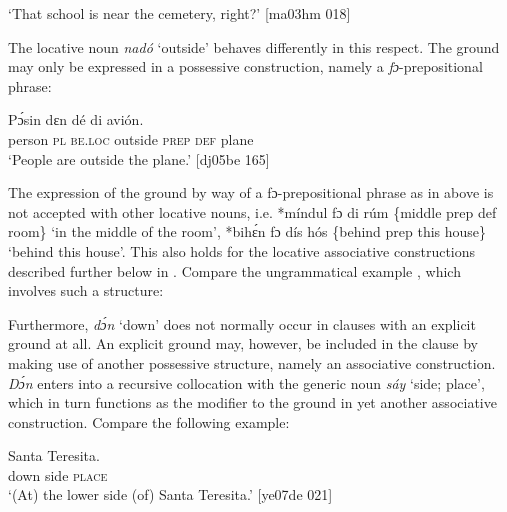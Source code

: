 \glt ‘That school is near the cemetery, right?’ [ma03hm 018]
\z

The locative noun \textit{nadó} ‘outside’ behaves differently in this respect. The ground may only be expressed in a possessive construction, namely a \textit{fɔ}{}-prepositional phrase:


\ea%
    \label{ex:key:928}
    \gll Pɔ́sin  dɛn  dé       di  avión.\\
person  \textsc{pl}  \textsc{be.loc}  outside  \textsc{prep}  \textsc{def}  plane\\

\glt ‘People are outside the plane.’ [dj05be 165]
\z

The expression of the ground by way of a fɔ-prepositional phrase as in  above is not accepted with other locative nouns, i.e. *míndul fɔ di rúm \{middle prep def room\} ‘in the middle of the room’, *bihɛ́n fɔ dís hós \{behind prep this house\} ‘behind this house’. This also holds for the locative associative constructions described further below in . Compare the ungrammatical example , which involves such a structure: 


\z

Furthermore, \textit{dɔ́n} ‘down’ does not normally occur in clauses with an explicit ground at all. An explicit ground may, however, be included in the clause by making use of another possessive structure, namely an associative construction. \textit{Dɔ́n} enters into a recursive collocation with the generic noun \textit{sáy} ‘side; place’, which in turn functions as the modifier to the ground in yet another associative construction. Compare the following example: 


\ea%
    \label{ex:key:930}
    \gll {}      Santa  Teresita.\\
down  side  \textsc{place}\\

\glt ‘(At) the lower side (of) Santa Teresita.’ [ye07de 021]
\z

